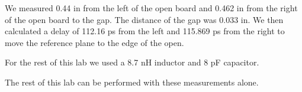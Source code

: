 We measured 0.44 in from the left of the open board and 0.462 in from the right of the open board to the gap. The distance of the gap was 0.033 in. We then calculated a delay of 112.16 ps from the left and 115.869 ps from the right to move the reference plane to the edge of the open.

For the rest of this lab we used a 8.7 nH inductor and 8 pF capacitor.

The rest of this lab can be performed with these measurements alone.

